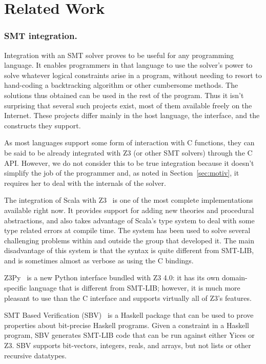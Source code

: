 \section{Related Work}

\subsubsection{SMT integration.}

Integration with an SMT solver proves to be useful for any programming
language. It enables programmers in that language to use the solver's power to
solve whatever logical constraints arise in a program, without needing to
resort to hand-coding a backtracking algorithm or other cumbersome methods.
The solutions thus obtained can be used in the rest of the program.
Thus it isn't surprising that several such projects exist, most of them
available freely on the Internet. These projects differ mainly in the host
language, the interface, and the constructs they support.

As most languages support some form of interaction with C functions, they can
be said to be already integrated with Z3 (or other SMT solvers) through the C
API. However, we do not consider this to be true integration because it
doesn't simplify the job of the programmer and, as noted in
Section~\ref{sec:motiv}, it requires her to deal with the internals of the
solver.

The integration of Scala with Z3~\cite{scalaz3} is one of the most complete
implementations available right now. It provides support for adding new
theories and procedural abstractions, and also takes advantage of Scala's type
system to deal with some type related errors at compile time.  The system has
been used to solve several challenging problems within and outside the group
that developed it. The main disadvantage of this system is that the syntax is
quite different from SMT-LIB, and is sometimes almost as verbose as using the
C bindings.

Z3Py~\cite{z3py} is a new Python interface bundled with Z3 4.0: it has its own
domain-specific language that is different from SMT-LIB; however, it is
much more pleasant to use than the C interface and supports virtually all of
Z3's features.

SMT Based Verification (SBV)~\cite{sbv} is a Haskell package that can be used
to prove properties about bit-precise Haskell programs. Given a constraint in
a Haskell program, SBV generates SMT-LIB code that can be run against either
Yices or Z3. SBV supports bit-vectors, integers, reals, and arrays, but not
lists or other recursive datatypes.

